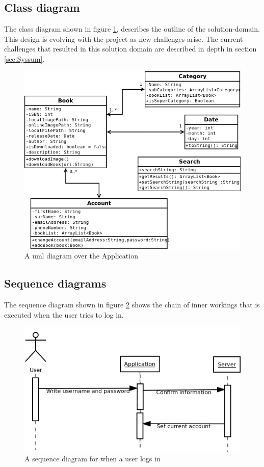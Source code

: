 \documentclass[12pt]{article}
\begin{document}
\subsection{Class diagram}
The class diagram shown in figure \ref{uml}, describes the outline of the solution-domain. This design is evolving with the project as new challenges arise. The current challenges that resulted in this solution domain are described in depth in section \ref{sec:Syssum}.
\begin{figure}[H]
\includegraphics[scale=0.6]{uml.png}
\caption{A uml diagram over the Application}
\label{uml}
\end{figure}
\subsection{Sequence diagrams}

The sequence diagram shown in figure \ref{SeqDiaLogin} shows the chain of inner workings that is executed when the user tries to log in.
\begin{figure}[H]
\includegraphics[scale=0.6]{SequenceDiagramLogin.png}
\caption{A sequence diagram for when a user logs in}
\label{SeqDiaLogin}
\end{figure}
\end{document}
